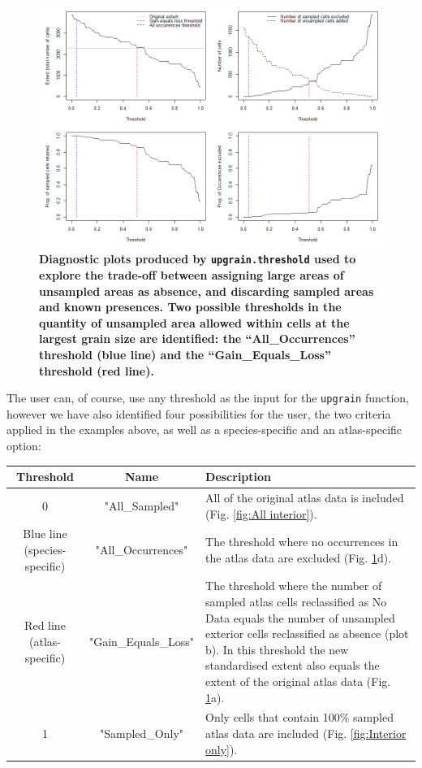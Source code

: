 \documentclass{article}[12pt, a4paper]
\begin{document}
\begin{figure}[ht]
\centering
\includegraphics[width=\linewidth]{Threshold_plots.png}
\caption{\textbf{Diagnostic plots produced by \texttt{upgrain.threshold} used to explore the trade-off  between assigning large areas of unsampled areas as absence, and discarding sampled areas and known presences. Two possible thresholds in the quantity of unsampled area allowed within cells at the largest grain size are identified: the “All\_Occurrences” threshold (blue line) and the “Gain\_Equals\_Loss” threshold (red line).}}
\label{fig:Threshold plots}
\end{figure}

The user can, of course, use any threshold as the input for the \texttt{upgrain} function, however we have also identified four possibilities for the user, the two criteria applied in the examples above, as well as a species-specific and an atlas-specific option: 

\begin{table}[!h]
\centering
\begin{tabular}{ c  c  p{6.2cm} }
\hline \noalign{\smallskip}
Threshold & Name & Description  \\
\hline \noalign{\smallskip}
0 & "All\_Sampled" & All of the original atlas data is included (Fig. \ref{fig:All interior}). \\ [0.2cm]

Blue line (species-specific) & "All\_Occurrences" & The threshold where no occurrences in the atlas data are excluded (Fig. \ref{fig:Threshold plots}d). \\ [0.2cm]

Red line (atlas-specific) & "Gain\_Equals\_Loss" & The threshold where the number of sampled atlas cells reclassified as No Data equals the number of unsampled exterior cells reclassified as absence (plot b). In this threshold the new standardised extent also equals the extent of the original atlas data (Fig. \ref{fig:Threshold plots}a). \\ [0.2cm]

1 & "Sampled\_Only" & Only cells that contain 100\% sampled atlas data are included (Fig. \ref{fig:Interior only}). \\ [0.1cm]
\hline
\end{tabular}
\end{table}
\end{document}
